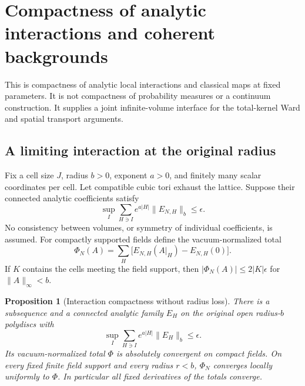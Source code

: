 \documentclass[11pt]{article}
\newtheorem{proposition}[theorem]{Proposition}
\theoremstyle{remark}
\begin{document}
\section{Compactness of analytic interactions and coherent backgrounds}
\label{aic-section}

This is compactness of analytic local interactions and classical
maps at fixed parameters. It is not compactness of probability
measures or a continuum construction. It supplies a joint
infinite-volume interface for the total-kernel Ward and spatial
transport arguments.

\subsection{A limiting interaction at the original radius}
\label{aic-interaction-section}

Fix a cell size \(J\), radius \(b>0\), exponent \(a>0\), and
finitely many scalar coordinates per cell. Let compatible cubic
tori exhaust the lattice. Suppose their connected analytic
coefficients satisfy
\begin{equation}
 \sup_I\sum_{H\ni I}e^{a|H|}\|E_{N,H}\|_b\le\epsilon .
 \label{aic-input}
\end{equation}
No consistency between volumes, or symmetry of individual
coefficients, is assumed. For compactly supported fields define
the vacuum-normalized total
\begin{equation}
 \Phi_N(A)=\sum_H\bigl[E_{N,H}(A|_H)-E_{N,H}(0)\bigr].
 \label{aic-total}
\end{equation}
If \(K\) contains the cells meeting the field support, then
\(|\Phi_N(A)|\le2|K|\epsilon\) for \(\|A\|_\infty<b\).

\begin{proposition}[Interaction compactness without radius loss]
\label{aic-interaction-proposition}
There is a subsequence and a connected analytic family \(E_H\)
on the original open radius-\(b\) polydiscs with
\begin{equation}
 \sup_I\sum_{H\ni I}e^{a|H|}\|E_H\|_b\le\epsilon .
 \label{aic-limit-norm}
\end{equation}
Its vacuum-normalized total \(\Phi\) is absolutely convergent on
compact fields. On every fixed finite field support and every
radius \(r<b\), \(\Phi_N\) converges locally uniformly to \(\Phi\).
In particular all fixed derivatives of the totals converge.
\end{proposition}
\end{document}
